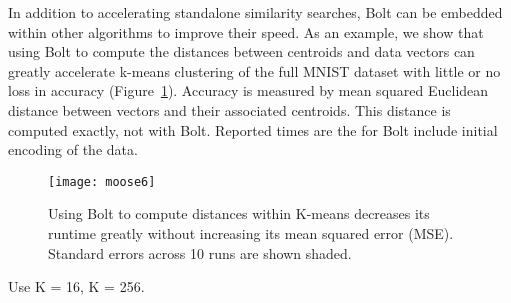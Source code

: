 In addition to accelerating standalone similarity searches, Bolt can be embedded within other algorithms to improve their speed. As an example, we show that using Bolt to compute the distances between centroids and data vectors can greatly accelerate k-means clustering of the full MNIST dataset with little or no loss in accuracy (Figure~\ref{fig:kmeans}). Accuracy is measured by mean squared Euclidean distance between vectors and their associated centroids. This distance is computed exactly, not with Bolt. Reported times are the for Bolt include initial encoding of the data.

\begin{figure}[h]
\begin{center}
\label{fig:kmeans}
\texttt{[image: moose6]}
\caption{Using Bolt to compute distances within K-means decreases its runtime greatly without increasing its mean squared error (MSE). Standard errors across 10 runs are shown shaded.}
\end{center}
\end{figure}

Use K = 16, K = 256.








